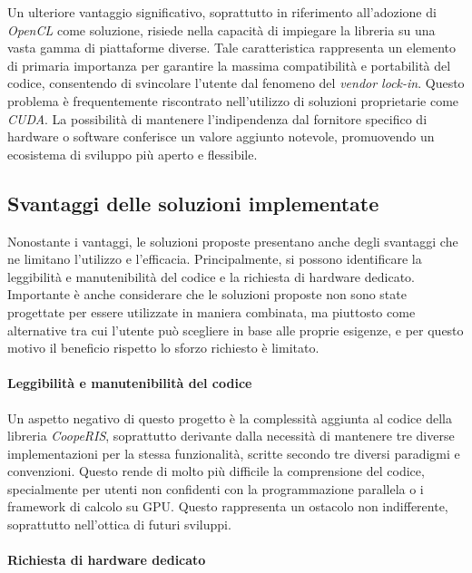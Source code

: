 Un ulteriore vantaggio significativo, soprattutto in riferimento all'adozione di
\textit{OpenCL} come soluzione, risiede nella capacità di impiegare la libreria
su una vasta gamma di piattaforme diverse. Tale caratteristica rappresenta un elemento
di primaria importanza per garantire la massima compatibilità e portabilità del codice,
consentendo di svincolare l'utente dal fenomeno del \textit{vendor lock-in}.
Questo problema è frequentemente riscontrato nell'utilizzo di soluzioni
proprietarie come \textit{CUDA}. La possibilità di mantenere l'indipendenza dal
fornitore specifico di hardware o software conferisce un valore aggiunto
notevole, promuovendo un ecosistema di sviluppo più aperto e flessibile.

\subsection{Svantaggi delle soluzioni implementate}
\label{sec:svantaggi}

Nonostante i vantaggi, le soluzioni proposte presentano anche degli svantaggi che
ne limitano l'utilizzo e l'efficacia. Principalmente, si possono identificare la
leggibilità e manutenibilità del codice e la richiesta di hardware dedicato.
Importante è anche considerare che le soluzioni proposte non sono state
progettate per essere utilizzate in maniera combinata, ma piuttosto come alternative
tra cui l'utente può scegliere in base alle proprie esigenze, e per questo
motivo il beneficio rispetto lo sforzo richiesto è limitato.

\paragraph{Leggibilità e manutenibilità del codice}
\label{para:leggibilita}

Un aspetto negativo di questo progetto è la complessità aggiunta al codice della
libreria \textit{CoopeRIS}, soprattutto derivante dalla necessità di mantenere
tre diverse implementazioni per la stessa funzionalità, scritte secondo tre diversi
paradigmi e convenzioni. Questo rende di molto più difficile la comprensione del
codice, specialmente per utenti non confidenti con la programmazione parallela o
i framework di calcolo su GPU. Questo rappresenta un ostacolo non indifferente, soprattutto
nell'ottica di futuri sviluppi.

\paragraph{Richiesta di hardware dedicato}
\label{para:hardware}

